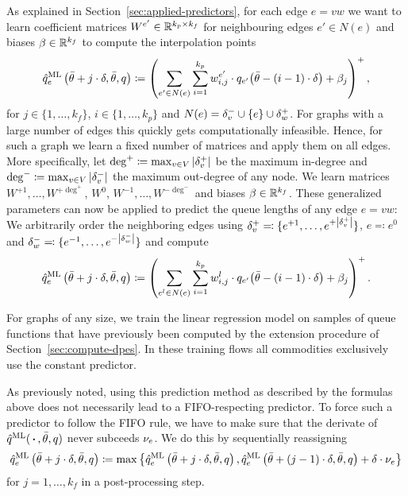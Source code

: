 As explained in Section~\ref{sec:applied-predictors}, for each edge $e=vw$ we want to learn coefficient matrices $W^{e'} \in \mathbb{R}^{k_p \times k_f}$ for neighbouring edges $e'\in N(e)$ and biases $\beta\in\mathbb{R}^{k_f}$ to compute the interpolation points \[
  \hat q^{\text{ML}}_e\left(\bar\theta + j\cdot\delta,\bar\theta,q \right) \coloneqq 
  \left(
  \sum_{e'\in N(e)} \sum_{i = 1}^{k_p} w^{e'}_{i, j} \cdot {q_{e'}}{\left( 
      \bar\theta - (i-1)\cdot\delta
  \right)}
  + \beta_j
  \right)^+,
\]
for $j\in\{1,\dots,k_f\}$, $i\in\{1,\dots,k_p\}$ and $N(e) = \delta^-_{v} \cup \{e\} \cup \delta^+_{w}$.
For graphs with a large number of edges this quickly gets computationally infeasible. Hence, for such a graph we learn a fixed number of matrices and apply them on all edges.
More specifically, let $\deg^+\coloneqq \max_{v\in V} \left|  \delta^+_{v}  \right|$ be the maximum in-degree and $\deg^-\coloneqq \max_{v\in V} \left| \delta^-_{v} \right|$ the maximum out-degree of any node.
We learn matrices $W^{+1},\dots,W^{+\deg^+}$, $W^0$, $W^{-1},\dots,W^{-\deg^-}$ and biases $\beta\in\mathbb{R}^{k_f}$.
These generalized parameters can now be applied to predict the queue lengths of any edge $e=vw$:
We arbitrarily order the neighboring edges using $\delta^+_{v} \eqqcolon \{ e^{+1},\dots,e^{+\left| \delta^+_{v} \right|}\}$, $e\eqqcolon e^0$ and $\delta^-_{w} \eqqcolon \{ e^{-1},\dots,e^{-\left| \delta^-_{w} \right|} \}$ and compute \[
  \hat q^{\text{ML}}_e\left(\bar\theta + j\cdot\delta,\bar\theta,q \right) \coloneqq 
  \left(
  \sum_{e^l\in N(e)} \sum_{i = 1}^{k_p} w^{l}_{i, j} \cdot {q_{e'}}{\left( 
      \bar\theta - (i-1)\cdot\delta
  \right)}
  + \beta_j
  \right)^+.
\]
 
For graphs of any size, we train the linear regression model on samples of queue functions that have previously been computed by the extension procedure of Section~\ref{sec:compute-dpes}.
In these training flows all commodities exclusively use the constant predictor.

As previously noted, using this prediction method as described by the formulas above does not necessarily lead to a FIFO-respecting predictor.
To force such a predictor to follow the FIFO rule, we have to make sure that the derivate of $\hat q^{\text{ML}}(\,\boldsymbol{\cdot}\,,\bar\theta,q)$ never subceeds $\nu_e$.
We do this by sequentially reassigning \[
  \hat q^{\text{ML}}_e\left(\bar\theta + j\cdot\delta,\bar\theta,q \right)
  \coloneqq \max\left\{
    \hat q^{\text{ML}}_e\left(\bar\theta + j\cdot\delta,\bar\theta,q \right), \hat q^{\text{ML}}_e\left(\bar\theta + (j-1)\cdot\delta,\bar\theta,q \right) + \delta\cdot \nu_e
    \right\}
  \]
for $j=1,\dots,k_f$ in a post-processing step.

